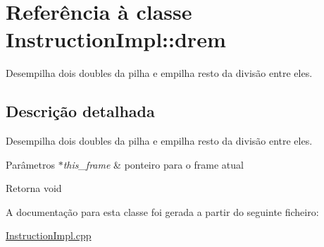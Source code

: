 \hypertarget{class_instruction_impl_1_1drem}{}\section{Referência à classe Instruction\+Impl\+:\+:drem}
\label{class_instruction_impl_1_1drem}


Desempilha dois doubles da pilha e empilha resto da divisão entre eles.  




\subsection{Descrição detalhada}
Desempilha dois doubles da pilha e empilha resto da divisão entre eles. 


\begin{DoxyParams}{Parâmetros}
{\em $\ast$this\+\_\+frame} & ponteiro para o frame atual \\
\hline
\end{DoxyParams}
\begin{DoxyReturn}{Retorna}
void 
\end{DoxyReturn}


A documentação para esta classe foi gerada a partir do seguinte ficheiro\+:\begin{DoxyCompactItemize}
\item 
\hyperlink{_instruction_impl_8cpp}{Instruction\+Impl.\+cpp}\end{DoxyCompactItemize}
